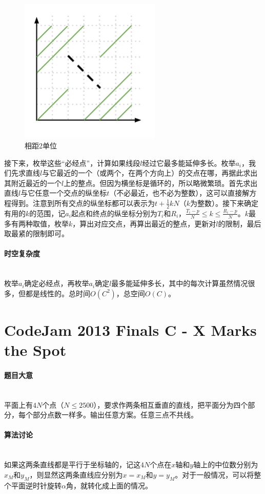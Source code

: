 \documentclass[UTF8]{ctexart}
\newcommand{\myparagraph}[1]{\paragraph{#1}\mbox{}\\}
\theoremstyle{nonumberplain}
\begin{document}
			\begin{figure}[ht]
				\centering
				\includegraphics[width=0.6\textwidth]{figgcj2013a_2.png}
				\caption{相距2单位}
			\end{figure}
			
			接下来，枚举这些“必经点”，计算如果线段$l$经过它最多能延伸多长。枚举$a_i$，我们先求直线$l$与它最近的一个（或两个，在两个方向上）的交点在哪，再据此求出其附近最近的一个$l$上的整点。但因为横坐标是循环的，所以略微繁琐。首先求出直线$l$与它任意一个交点的纵坐标$t$（不必最近，也不必为整数），这可以直接解方程得到。注意到所有交点的纵坐标都可以表示为$t+\frac{1}{2}kN$（$k$为整数）。接下来确定有用的$k$的范围，记$a_i$起点和终点的纵坐标分别为$T_i$和$R_i$，$\frac{T_i-p}{N} \leq k \leq \frac{R_i-p}{N}$。$k$最多有两种取值，枚举$k$，算出对应交点，再算出最近的整点，更新对$l$的限制，最后取最紧的限制即可。
		
		\myparagraph{时空复杂度}
		
			枚举$a_i$确定必经点，再枚举$a_i$确定$l$最多能延伸多长，其中的每次计算虽然情况很多，但都是线性的。总时间$O(C^2)$，总空间$O(C)$。
	
	\section{CodeJam 2013 Finals C - X Marks the Spot}
	
		\myparagraph{题目大意}
		
			平面上有$4N$个点（$N \leq 2500$），要求作两条相互垂直的直线，把平面分为四个部分，每个部分点数一样多。输出任意方案。任意三点不共线。
		
		\myparagraph{算法讨论}
		
			如果这两条直线都是平行于坐标轴的，记这$4N$个点在$x$轴和$y$轴上的中位数分别为$x_M$和$y_M$，则显然这两条直线应分别为$x=x_M$和$y=y_M$。对于一般情况，可以将整个平面逆时针旋转$\alpha$角，就转化成上面的情况。
			
\end{document}
